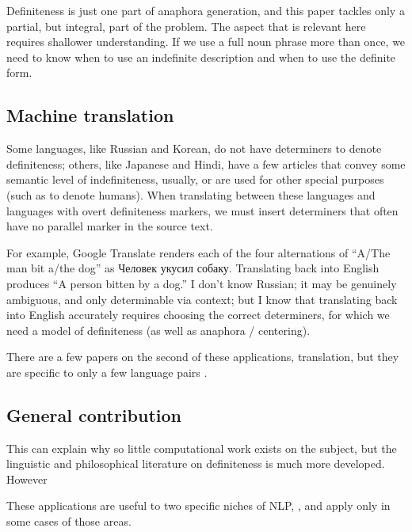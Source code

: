 \documentclass[11pt]{article}
\begin{document}
Definiteness is just one part of anaphora generation, and this paper tackles only a partial, but integral, part of the problem. The aspect that is relevant here requires shallower understanding. If we use a full noun phrase more than once, we need to know when to use an indefinite description and when to use the definite form.



\subsection{Machine translation}

Some languages, like Russian and Korean, do not have determiners to denote definiteness; others, like Japanese and Hindi, have a few articles that convey some semantic level of indefiniteness, usually, or are used for other special purposes (such as to denote humans). %
When translating between these languages and languages with overt definiteness markers, we must insert determiners that often have no parallel marker in the source text.

For example, Google Translate renders each of the four alternations of ``A/The man bit a/the dog'' as \foreignlanguage{russian}{Человек укусил собаку.} Translating back into English produces ``A person bitten by a dog.'' I don't know Russian; it may be genuinely ambiguous, and only determinable via context; but I know that translating back into English accurately requires choosing the correct determiners, for which we need a model of definiteness (as well as anaphora / centering).





\noindent
There are a few papers on the second of these applications, translation, but they are specific to only a few language pairs \citep{ishikawa:1995, siegel:1996}.

\subsection{General contribution}
This can explain why so little computational work exists on the subject, but the linguistic and philosophical literature on definiteness is much more developed.
However


These applications are useful to two specific niches of NLP, , and apply only in some cases of those areas.


\end{document}
